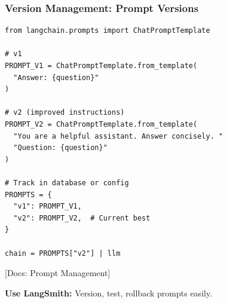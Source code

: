 \documentclass[aspectratio=169,11pt]{beamer}
\newcommand{\docref}[1]{{\scriptsize\color{docgray}[Docs: #1]}}
\begin{document}
\begin{frame}[fragile,shrink=5]
\frametitle{Version Management: Prompt Versions}

\begin{lstlisting}
from langchain.prompts import ChatPromptTemplate

# v1
PROMPT_V1 = ChatPromptTemplate.from_template(
  "Answer: {question}"
)

# v2 (improved instructions)
PROMPT_V2 = ChatPromptTemplate.from_template(
  "You are a helpful assistant. Answer concisely. "
  "Question: {question}"
)

# Track in database or config
PROMPTS = {
  "v1": PROMPT_V1,
  "v2": PROMPT_V2,  # Current best
}

chain = PROMPTS["v2"] | llm
\end{lstlisting}

\docref{Prompt Management}

\small\textbf{Use LangSmith:} Version, test, rollback prompts easily.

\end{frame}
\end{document}
